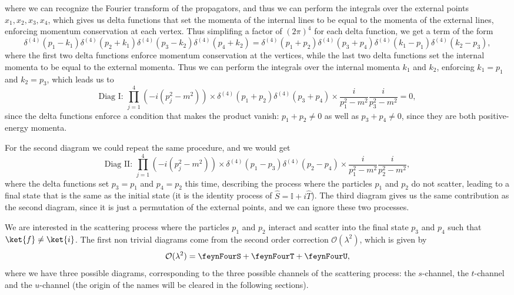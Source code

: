 where we can recognize the Fourier transform of the propagators, and thus we can perform the integrals over the external points \(x_1, x_2, x_3, x_4\), which gives us delta functions that set the momenta of the internal lines to be equal to the momenta of the external lines, enforcing momentum conservation at each vertex. Thus simplifing a factor of \((2\pi)^4\) for each delta function, we get a term of the form
\[
    \delta^{(4)}(p_1 - k_1) \delta^{(4)}(p_2 + k_1) \delta^{(4)}(p_3 - k_2) \delta^{(4)}(p_4 + k_2) = \delta^{(4)}(p_1 + p_2) \delta^{(4)}(p_3 + p_4) \delta^{(4)}(k_1 - p_1) \delta^{(4)}(k_2 - p_3),
\]
where the first two delta functions enforce momentum conservation at the vertices, while the last two delta functions set the internal momenta to be equal to the external momenta. Thus we can perform the integrals over the internal momenta \(k_1\) and \(k_2\), enforcing \(k_1 = p_1\) and \(k_2 = p_3\), which leads us to
\[
    \text{Diag I: } \prod_{j=1}^4 \left( -i(p_j^2 -m^2) \right) \times \delta^{(4)}(p_1 + p_2) \delta^{(4)}(p_3 + p_4) \times \frac{i}{p_1^2 - m^2} \frac{i}{p_3^2 - m^2} = 0,
\]
since the delta functions enforce a condition that makes the product vanish: \(p_1 + p_2 \neq 0\) as well as \(p_3 + p_4 \neq 0\), since they are both positive-energy momenta.

For the second diagram we could repeat the same procedure, and we would get
\[
    \text{Diag II: } \prod_{j=1}^4 \left( -i(p_j^2 -m^2) \right) \times \delta^{(4)}(p_1 - p_3) \delta^{(4)}(p_2 - p_4) \times \frac{i}{p_1^2 - m^2}\frac{i}{p_2^2 - m^2},
\]
where the delta functions set \(p_3 = p_1\) and \(p_4 = p_2\) this time, describing the process where the particles \(p_1\) and \(p_2\) do not scatter, leading to a final state that is the same as the initial state (it is the identity process of \(\hat{S} = \mathbb{I} + i \hat{T}\)). The third diagram gives us the same contribution as the second diagram, since it is just a permutation of the external points, and we can ignore these two processes.

We are interested in the scattering process where the particles \(p_1\) and \(p_2\) interact and scatter into the final state \(p_3\) and \(p_4\) such that \(\ket{f} \neq \ket{i}\). The first non trivial diagrams come from the second order correction \(\mathcal{O}(\lambda^2)\), which is given by
\[
    \mathcal{O}(\lambda^2) = \feynFourS + \feynFourT + \feynFourU,
\]
where we have three possible diagrams, corresponding to the three possible channels of the scattering process: the \(s\)-channel, the \(t\)-channel and the \(u\)-channel (the origin of the names will be cleared in the following sections).

